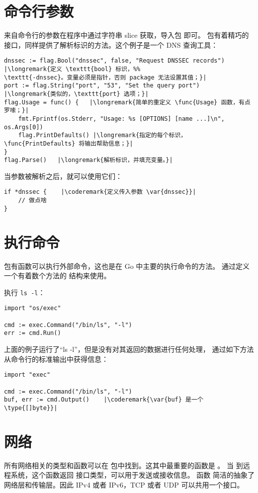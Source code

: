\section{命令行参数}
\label{sec:option parsing}
来自命令行的参数在程序中通过字符串 slice  获取，导入包  即可。
 包有着精巧的接口，同样提供了解析标识的方法。这个例子是一个 DNS 查询工具：
\begin{lstlisting}
dnssec := flag.Bool("dnssec", false, "Request DNSSEC records") |\longremark{定义 \texttt{bool} 标识，%%
\texttt{-dnssec}。变量必须是指针，否则 package 无法设置其值；}|
port := flag.String("port", "53", "Set the query port")      |\longremark{类似的，\texttt{port} 选项；}|
flag.Usage = func() {   |\longremark{简单的重定义 \func{Usage} 函数，有点罗嗦；}|
    fmt.Fprintf(os.Stderr, "Usage: %s [OPTIONS] [name ...]\n", os.Args[0])
    flag.PrintDefaults() |\longremark{指定的每个标识，\func{PrintDefaults} 将输出帮助信息；}|
}
flag.Parse()   |\longremark{解析标识，并填充变量。}|
\end{lstlisting}
\showremarks
当参数被解析之后，就可以使用它们：
\begin{lstlisting}
if *dnssec {    |\coderemark{定义传入参数 \var{dnssec}}|
    // 做点啥
}
\end{lstlisting}

\section{执行命令}
 包有函数可以执行外部命令，这也是在 Go 中主要的执行命令的方法。
通过定义一个有着数个方法的  结构来使用。

执行 \verb|ls -l|：
\begin{lstlisting}
import "os/exec"

cmd := exec.Command("/bin/ls", "-l")
err := cmd.Run()
\end{lstlisting}
上面的例子运行了``ls -l''，但是没有对其返回的数据进行任何处理，
通过如下方法从命令行的标准输出中获得信息：
\begin{lstlisting}
import "exec"

cmd := exec.Command("/bin/ls", "-l")
buf, err := cmd.Output()    |\coderemark{\var{buf} 是一个 \type{[]byte}}|
\end{lstlisting}

\section{网络}
所有网络相关的类型和函数可以在  包中找到。这其中最重要的函数是 。
当  到远程系统，这个函数返回  接口类型，可以用于发送或接收信息。
函数  简洁的抽象了网络层和传输层。因此 IPv4 或者 IPv6，TCP 或者 UDP 可以共用一个接口。

